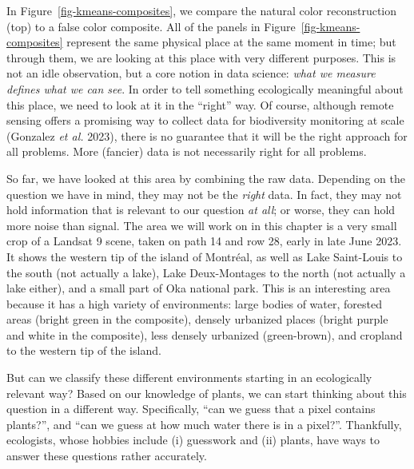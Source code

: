 \documentclass[
  letterpaper,
]{scrbook}
\begin{document}
In Figure~\ref{fig-kmeans-composites}, we compare the natural color
reconstruction (top) to a false color composite. All of the panels in
Figure~\ref{fig-kmeans-composites} represent the same physical place at
the same moment in time; but through them, we are looking at this place
with very different purposes. This is not an idle observation, but a
core notion in data science: \emph{what we measure defines what we can
see}. In order to tell something ecologically meaningful about this
place, we need to look at it in the ``right'' way. Of course, although
remote sensing offers a promising way to collect data for biodiversity
monitoring at scale (Gonzalez \emph{et al.} 2023), there is no guarantee
that it will be the right approach for all problems. More (fancier) data
is not necessarily right for all problems.


So far, we have looked at this area by combining the raw data. Depending
on the question we have in mind, they may not be the \emph{right} data.
In fact, they may not hold information that is relevant to our question
\emph{at all}; or worse, they can hold more noise than signal. The area
we will work on in this chapter is a very small crop of a Landsat 9
scene, taken on path 14 and row 28, early in late June 2023. It shows
the western tip of the island of Montréal, as well as Lake Saint-Louis
to the south (not actually a lake), Lake Deux-Montages to the north (not
actually a lake either), and a small part of Oka national park. This is
an interesting area because it has a high variety of environments: large
bodies of water, forested areas (bright green in the composite), densely
urbanized places (bright purple and white in the composite), less
densely urbanized (green-brown), and cropland to the western tip of the
island.

But can we classify these different environments starting in an
ecologically relevant way? Based on our knowledge of plants, we can
start thinking about this question in a different way. Specifically,
``can we guess that a pixel contains plants?'', and ``can we guess at
how much water there is in a pixel?''. Thankfully, ecologists, whose
hobbies include (i) guesswork and (ii) plants, have ways to answer these
questions rather accurately.
\end{document}
